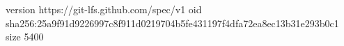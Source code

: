 version https://git-lfs.github.com/spec/v1
oid sha256:25a9f91d9226997c8f911d0219704b5fe431197f4dfa72ea8ec13b31e293b0c1
size 5400
